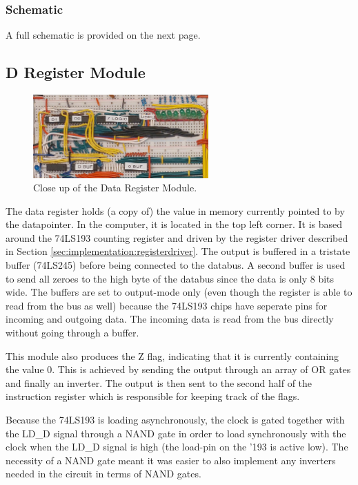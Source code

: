 \subsubsection{Schematic}
A full schematic is provided on the next page.




\subsection{D Register Module}
\begin{figure}[H]
  \centering
  \includegraphics[width=0.6\textwidth]{img/dregistercloseup}
  \caption{Close up of the Data Register Module.}
  \label{fig:dregcloseup}
\end{figure}

The data register holds (a copy of) the value in memory currently pointed to by the datapointer. In the computer, it is located in the top left corner. It is based around the 74LS193 counting register and driven by the register driver described in Section \ref{sec:implementation:registerdriver}. The output is buffered in a tristate buffer (74LS245) before being connected to the databus. A second buffer is used to send all zeroes to the high byte of the databus since the data is only 8 bits wide. The buffers are set to output-mode only (even though the register is able to read from the bus as well) because the 74LS193 chips have seperate pins for incoming and outgoing data. The incoming data is read from the bus directly without going through a buffer.

This module also produces the Z flag, indicating that it is currently containing the value 0. This is achieved by sending the output through an array of OR gates and finally an inverter. The output is then sent to the second half of the instruction register which is responsible for keeping track of the flags.

Because the 74LS193 is loading asynchronously, the clock is gated together with the LD\_D signal through a NAND gate in order to load synchronously with the clock when the LD\_D signal is high (the load-pin on the '193 is active low). The necessity of a NAND gate meant it was easier to also implement any inverters needed in the circuit in terms of NAND gates.


